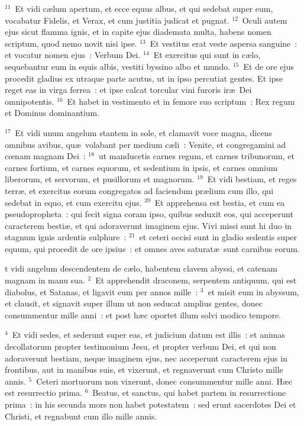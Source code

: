 ${}^{11}$~Et vidi c\ae lum apertum, et ecce equus albus, et qui sedebat super eum, vocabatur Fidelis, et Verax, et cum justitia judicat et pugnat.
${}^{12}$~Oculi autem ejus sicut flamma ignis, et in capite ejus diademata multa, habens nomen scriptum, quod nemo novit nisi ipse.
${}^{13}$~Et vestitus erat veste aspersa sanguine~: et vocatur nomen ejus~: Verbum Dei.
${}^{14}$~Et exercitus qui sunt in c\ae lo, sequebantur eum in equis albis, vestiti byssino albo et mundo.
${}^{15}$~Et de ore ejus procedit gladius ex utraque parte acutus, ut in ipso percutiat gentes. Et ipse reget eas in virga ferrea~: et ipse calcat torcular vini furoris ir\ae\ Dei omnipotentis.
${}^{16}$~Et habet in vestimento et in femore suo scriptum~: Rex regum et Dominus dominantium.


${}^{17}$~Et vidi unum angelum stantem in sole, et clamavit voce magna, dicens omnibus avibus, qu\ae\ volabant per medium c\ae li~: Venite, et congregamini ad cœnam magnam Dei~:
${}^{18}$~ut manducetis carnes regum, et carnes tribunorum, et carnes fortium, et carnes equorum, et sedentium in ipsis, et carnes omnium liberorum, et servorum, et pusillorum et magnorum.
${}^{19}$~Et vidi bestiam, et reges terr\ae , et exercitus eorum congregatos ad faciendum pr\ae lium cum illo, qui sedebat in equo, et cum exercitu ejus.
${}^{20}$~Et apprehensa est bestia, et cum ea pseudopropheta~: qui fecit signa coram ipso, quibus seduxit eos, qui acceperunt caracterem besti\ae , et qui adoraverunt imaginem ejus. Vivi missi sunt hi duo in stagnum ignis ardentis sulphure~:
${}^{21}$~et ceteri occisi sunt in gladio sedentis super equum, qui procedit de ore ipsius~: et omnes aves saturat\ae\ sunt carnibus eorum.

\bchapter
{}t vidi angelum descendentem de c\ae lo, habentem clavem abyssi, et catenam magnam in manu sua.
${}^{2}$~Et apprehendit draconem, serpentem antiquum, qui est diabolus, et Satanas, et ligavit eum per annos mille~:
${}^{3}$~et misit eum in abyssum, et clausit, et signavit super illum ut non seducat amplius gentes, donec consummentur mille anni~: et post h\ae c oportet illum solvi modico tempore.


${}^{4}$~Et vidi sedes, et sederunt super eas, et judicium datum est illis~: et animas decollatorum propter testimonium Jesu, et propter verbum Dei, et qui non adoraverunt bestiam, neque imaginem ejus, nec acceperunt caracterem ejus in frontibus, aut in manibus suis, et vixerunt, et regnaverunt cum Christo mille annis.
${}^{5}$~Ceteri mortuorum non vixerunt, donec consummentur mille anni. H\ae c est resurrectio prima.
${}^{6}$~Beatus, et sanctus, qui habet partem in resurrectione prima~: in his secunda mors non habet potestatem~: sed erunt sacerdotes Dei et Christi, et regnabunt cum illo mille annis.


